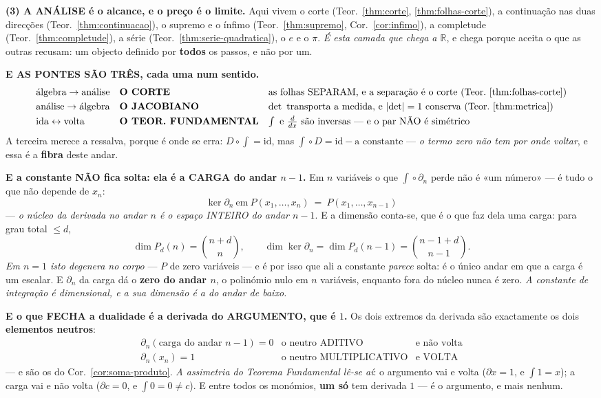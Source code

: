 \documentclass[11pt,a4paper]{article}
\newcommand{\abs}[1]{\lvert #1\rvert}
\begin{document}
\textbf{(3) A ANÁLISE é o alcance, e o preço é o limite.} Aqui vivem o corte
(Teor.~\ref{thm:corte}, \ref{thm:folhas-corte}), a continuação nas duas direcções
(Teor.~\ref{thm:continuacao}), o supremo e o ínfimo (Teor.~\ref{thm:supremo},
Cor.~\ref{cor:infimo}), a completude (Teor.~\ref{thm:completude}), a série
(Teor.~\ref{thm:serie-quadratica}), o $e$ e o $\pi$. \emph{É esta camada que chega a
$\mathbb{R}$}, e chega porque aceita o que as outras recusam: um objecto definido por
\textbf{todos} os passos, e não por um.

\medskip
\noindent\textbf{E AS PONTES SÃO TRÊS, cada uma num sentido.}
\[
\begin{array}{lll}
\text{álgebra}\to\text{análise} & \textbf{O CORTE} &
\text{as folhas SEPARAM, e a separação é o corte (Teor.~\ref{thm:folhas-corte})}\\[3pt]
\text{análise}\to\text{álgebra} & \textbf{O JACOBIANO} &
\det\text{ transporta a medida, e }\abs{\det}=1\text{ conserva (Teor.~\ref{thm:metrica})}\\[3pt]
\text{ida}\leftrightarrow\text{volta} & \textbf{O TEOR. FUNDAMENTAL} &
\int\text{ e }\tfrac{d}{dx}\text{ são inversas --- e o par NÃO é simétrico}
\end{array}
\]
A terceira merece a ressalva, porque é onde se erra: $D\circ\!\int=\mathrm{id}$, mas
$\int\!\circ D=\mathrm{id}-\text{a constante}$ --- \emph{o termo zero não tem por onde
voltar}, e essa é a \textbf{fibra} deste andar.

\textbf{E a constante NÃO fica solta: ela é a CARGA do andar $n-1$.} Em $n$ variáveis o que
$\int\!\circ\partial_n$ perde não é «um número» --- é tudo o que não depende de $x_n$:
\[
\boxed{\;\ker\partial_n\ \text{em}\ P(x_1,\ldots,x_n)\ =\ P(x_1,\ldots,x_{n-1})\;}
\]
--- \emph{o núcleo da derivada no andar $n$ é o espaço INTEIRO do andar $n-1$}. E a
dimensão conta-se, que é o que faz dela uma carga: para grau total $\leq d$,
\[
\dim P_d(n)=\binom{n+d}{n},
\qquad
\dim\ker\partial_n=\dim P_d(n-1)=\binom{n-1+d}{n-1}.
\]
\emph{Em $n=1$ isto degenera no corpo} --- $P$ de zero variáveis --- e é por isso que ali a
constante \emph{parece} solta: é o único andar em que a carga é um escalar. E
$\partial_n$ da carga dá o \textbf{zero do andar $n$}, o polinómio nulo em $n$ variáveis,
enquanto fora do núcleo nunca é zero. \emph{A constante de integração é dimensional, e a
sua dimensão é a do andar de baixo.}

\textbf{E o que FECHA a dualidade é a derivada do ARGUMENTO, que é $1$.} Os dois extremos
da derivada são exactamente os dois \textbf{elementos neutros}:
\[
\boxed{
\begin{array}{lll}
\partial_n(\text{carga do andar }n{-}1) = 0 & \text{o neutro ADITIVO} & \text{e não volta}\\[2pt]
\partial_n(x_n) = 1 & \text{o neutro MULTIPLICATIVO} & \text{e VOLTA}
\end{array}}
\]
--- e são os do Cor.~\ref{cor:soma-produto}. \emph{A assimetria do Teorema Fundamental
lê-se aí}: o argumento vai e volta ($\partial x=1$, e $\int1=x$); a carga vai e não volta
($\partial c=0$, e $\int0=0\neq c$). E entre todos os monómios, \textbf{um só} tem derivada
$1$ --- é o argumento, e mais nenhum.
\end{document}
